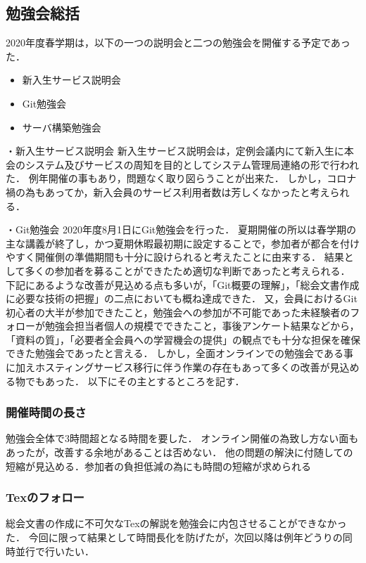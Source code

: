 \subsection*{勉強会総括}


2020年度春学期は，以下の一つの説明会と二つの勉強会を開催する予定であった．

\begin{itemize}
  \item 新入生サービス説明会
  \item Git勉強会
  \item サーバ構築勉強会
\end{itemize}

・新入生サービス説明会
新入生サービス説明会は，定例会議内にて新入生に本会のシステム及びサービスの周知を目的としてシステム管理局連絡の形で行われた．
例年開催の事もあり，問題なく取り図らうことが出来た．
しかし，コロナ禍の為もあってか，新入会員のサービス利用者数は芳しくなかったと考えられる．

・Git勉強会
2020年度8月1日にGit勉強会を行った．
夏期開催の所以は春学期の主な講義が終了し，かつ夏期休暇最初期に設定することで，参加者が都合を付けやすく開催側の準備期間も十分に設けられると考えたことに由来する．
結果として多くの参加者を募ることができたため適切な判断であったと考えられる．
下記にあるような改善が見込める点も多いが，「Git概要の理解」，「総会文書作成に必要な技術の把握」の二点においても概ね達成できた．
又，会員におけるGit初心者の大半が参加できたこと，勉強会への参加が不可能であった未経験者のフォローが勉強会担当者個人の規模でできたこと，事後アンケート結果などから，「資料の質」，「必要者全会員への学習機会の提供」の観点でも十分な担保を確保できた勉強会であったと言える．
しかし，全面オンラインでの勉強会である事に加えホスティングサービス移行に伴う作業の存在もあって多くの改善が見込める物でもあった．
以下にその主とするところを記す．
\subsubsection*{開催時間の長さ}
勉強会全体で3時間超となる時間を要した．
オンライン開催の為致し方ない面もあったが，改善する余地があることは否めない．
他の問題の解決に付随しての短縮が見込める．参加者の負担低減の為にも時間の短縮が求められる
\subsubsection*{Texのフォロー}
総会文書の作成に不可欠なTexの解説を勉強会に内包させることができなかった．
今回に限って結果として時間長化を防げたが，次回以降は例年どうりの同時並行で行いたい．
